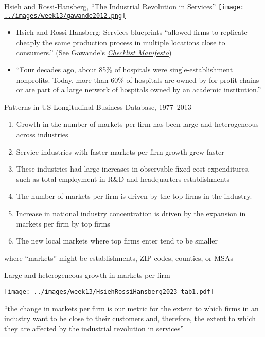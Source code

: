 \documentclass[11pt,notes=hide,aspectratio=169]{beamer}
\begin{document}
\begin{frame}{Hsieh and Rossi-Hansberg, ``The Industrial Revolution in Services''}
\href{https://www.proquest.com/docview/1034376010}{\texttt{[image: ../images/week13/gawande2012.png]}}
\begin{itemize}
\item Hsieh and Rossi-Hansberg: Services blueprints ``allowed firms to replicate cheaply the same production process in multiple locations close to consumers.''
(See Gawande's \href{https://atulgawande.com/book/the-checklist-manifesto/}{\textit{Checklist Manifesto}})
\item ``Four decades ago, about 85\% of hospitals were single-establishment nonprofits. Today, more than 60\% of hospitals are owned by for-profit chains or are part of a large network of hospitals owned by an academic institution.''
\end{itemize}
\end{frame}
\begin{frame}{Patterns in US Longitudinal Business Database, 1977--2013}
\begin{enumerate}
	\item Growth in the number of markets per firm has been large and heterogeneous across industries
	\item Service industries with faster markets-per-firm growth grew faster
	\item These industries had large increases in observable fixed-cost expenditures, such as total employment in R\&D and headquarters establishments
	\item The number of markets per firm is driven by the top firms in the industry.
	\item Increase in national industry concentration is driven by the expansion in markets per firm by top firms
	\item The new local markets where top firms enter tend to be smaller
\end{enumerate}
where ``markets'' might be establishments, ZIP codes, counties, or MSAs
\end{frame}
\begin{frame}{Large and heterogeneous growth in markets per firm}
\begin{center}
\texttt{[image: ../images/week13/HsiehRossiHansberg2023\_tab1.pdf]}
\end{center}\vspace{-3mm}
{\small ``the change in markets per firm is our metric for the extent to which firms in an industry want to be close to their customers and, therefore, the extent to which they are affected by the industrial revolution in services''\par}
\end{frame}
\end{document}
